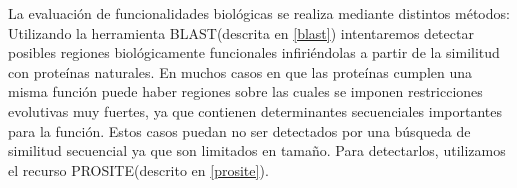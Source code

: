 La evaluación de funcionalidades biológicas se realiza mediante distintos métodos:
Utilizando la herramienta BLAST(descrita en \ref{blast}) intentaremos detectar posibles regiones biológicamente funcionales infiriéndolas a partir de la similitud con proteínas naturales.
En muchos casos en que las proteínas cumplen una misma función puede haber regiones sobre 
las cuales se imponen restricciones evolutivas muy fuertes, ya que contienen determinantes secuenciales importantes para la función.
Estos casos puedan no ser detectados por una búsqueda de similitud secuencial ya que son limitados en tamaño. 
Para detectarlos, utilizamos el recurso PROSITE(descrito en \ref{prosite}).





